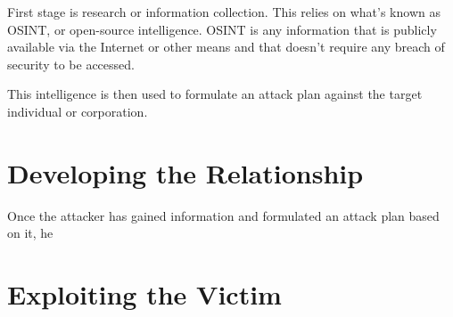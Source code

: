 First stage is research or information collection. This relies on what's known as OSINT, or open-source intelligence. OSINT is any information that is publicly available via the Internet or other means and that doesn't require any breach of security to be accessed.

This intelligence is then used to formulate an attack plan against the target individual or corporation.







\section{Developing the Relationship}

Once the attacker has gained information and formulated an attack plan based on it, he 


 





\section{Exploiting the Victim}










